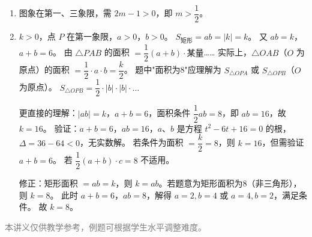 \documentclass[12pt, a4paper]{ctexart}
\begin{document}
\begin{knowledgebox}[参考答案]
\begin{enumerate}[label=\textbf{\arabic*.}, leftmargin=2em]
  \item 图象在第一、三象限，需 $2m - 1 > 0$，即 $m > \dfrac{1}{2}$。

  \item $k > 0$，点 $P$ 在第一象限，$a > 0$，$b > 0$。
  $S_{\text{矩形}} = ab = |k| = k$。
  又 $ab = k$，$a + b = 6$。
  由 $\triangle PAB$ 的面积 $= \dfrac{1}{2}(a + b) \cdot \text{某量}$……
  实际上，$\triangle OAB$（$O$ 为原点）的面积 $= \dfrac{1}{2} \cdot a \cdot b = \dfrac{k}{2}$。
  题中"面积为8"应理解为 $S_{\triangle OPA}$ 或 $S_{\triangle OPB}$（$O$为原点）。
  $S_{\triangle OPB} = \dfrac{1}{2} \cdot |b| \cdot |b| \cdot \ldots$

  更直接的理解：$|ab| = k$，$a + b = 6$，面积条件 $\dfrac{1}{2}ab = 8$，即 $ab = 16$，故 $k = 16$。
  验证：$a + b = 6$，$ab = 16$，$a$、$b$ 是方程 $t^2 - 6t + 16 = 0$ 的根，$\Delta = 36 - 64 < 0$，无实数解。
  若条件为面积 $= \dfrac{k}{2} = 8$，则 $k = 16$，但需验证 $a + b = 6$。
  若 $\dfrac{1}{2}(a + b) \cdot c = 8$ 不适用。

  修正：矩形面积 $= ab = k$，则 $k = ab$。若题意为矩形面积为8（非三角形），则 $k = 8$。
  此时 $a + b = 6$，$ab = 8$，解得 $a = 2, b = 4$ 或 $a = 4, b = 2$，满足条件。
  故 $\boxed{k = 8}$。
\end{enumerate}
\end{knowledgebox}

\vfill
\begin{center}
\small\textcolor{gray}{本讲义仅供教学参考，例题可根据学生水平调整难度。}
\end{center}
\end{document}
